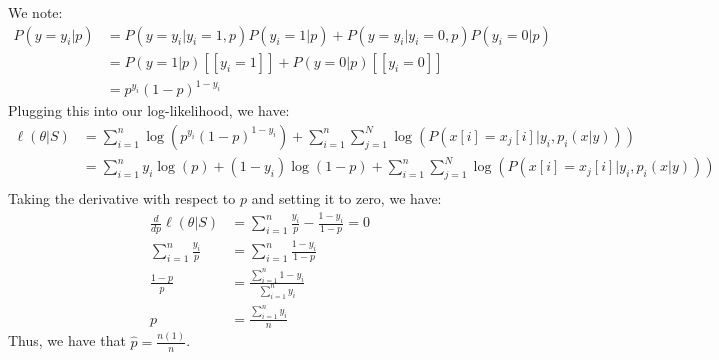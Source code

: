 \documentclass{amsart}
\theoremstyle{definition}
\begin{document}
\begin{enumerate}[(a)]
	We note:
	\begin{align*}
		P(y = y_i|p) &= P(y = y_i| y_i = 1, p)P(y_i = 1| p) + P(y = y_i| y_i = 0, p)P(y_i = 0| p)\\
		&= P(y = 1 |p)[[y_i = 1]] + P(y = 0 | p)[[y_i = 0]]\\
		&= p^{y_i}(1-p)^{1-y_i}
	\end{align*}
	Plugging this into our log-likelihood, we have:
	\begin{align*}
		\ell(\theta|S) &= \sum_{i=1}^{n}\log(p^{y_i}(1-p)^{1-y_i}) + \sum_{i=1}^{n}\sum_{j=1}^{N} \log(P(x[i] = x_j[i]| y_i, p_i(x|y)))\\
		&= \sum_{i=1}^{n}y_i\log(p) + (1-y_i)\log(1-p) + \sum_{i=1}^{n}\sum_{j=1}^{N} \log(P(x[i] = x_j[i]| y_i, p_i(x|y)))\\
	\end{align*}
	Taking the derivative with respect to $p$ and setting it to zero, we have:
	\begin{align*}
		\frac{d}{dp}\ell(\theta|S) &= \sum_{i=1}^{n}\frac{y_i}{p} - \frac{1-y_i}{1-p} = 0\\
		\sum_{i=1}^{n}\frac{y_i}{p} &= \sum_{i=1}^{n}\frac{1-y_i}{1-p}\\
		\frac{1-p}{p} &= \frac{\sum_{i = 1}^{n} 1- y_i}{\sum_{i = 1}^{n} y_i}\\
		p &= \frac{\sum_{i = 1}^{n} y_i}{n}
	\end{align*}
	Thus, we have that $\hat{p} = \frac{n(1)}{n}$.


\end{enumerate}
\end{document}
